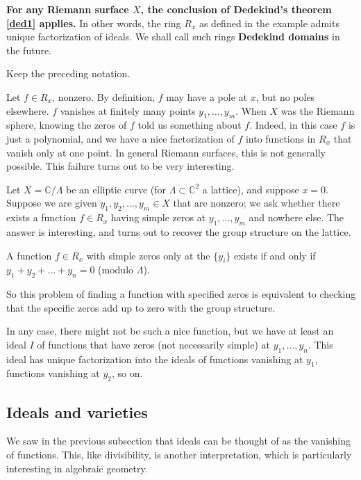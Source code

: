 \textbf{For any Riemann surface $X$, the conclusion of Dedekind's theorem
\ref{ded1} applies.} In other words, the ring $R_x$ as defined in the example
admits unique factorization of ideals. We shall call such rings
\textbf{Dedekind domains} in the future.

\begin{example}
Keep the preceding notation.

Let $f \in R_x$, nonzero. By definition, $f$ may have a pole at $x$, but no
poles elsewhere. $f$ vanishes at finitely many points $y_1, \dots, y_m$. When
$X$ was the Riemann sphere, knowing the zeros of $f$ told us something about
$f$. Indeed, in this case $f$ is just a polynomial, and we have a nice
factorization of $f$ into functions in $R_x$ that vanish only at one point. In
general Riemann surfaces, this is not generally possible. This failure turns
out to be very interesting.

Let $X = \mathbb{C}/\Lambda$ be an elliptic curve (for $\Lambda \subset
\mathbb{C}^2$ a lattice), and suppose $x = 0$. Suppose we are given $y_1, y_2,
\dots, y_m \in X$ that are nonzero; we ask whether there exists a function $f
\in R_x$ having simple zeros at $y_1, \dots, y_m$ and nowhere else. The answer
is interesting, and turns out to recover the group structure on the lattice.

\begin{proposition}
A function $f \in R_x$ with simple zeros only at the $\{ y_i \}$ exists if and
only if $y_1 + y_2 + \dots + y_n = 0$ (modulo $\Lambda$).
\end{proposition}

So this problem of finding a function with specified zeros is equivalent to
checking that the specific zeros add up to zero with the group structure.

In any case, there might not be such a nice function, but we have at least an
ideal $I$ of functions that have zeros (not necessarily simple) at $y_1, \dots,
y_n$. This ideal has unique factorization into the ideals of functions
vanishing at $y_1$, functions vanishing at $y_2$, so on.
\end{example}

\subsection{Ideals and varieties}

We saw in the previous subsection that ideals can be thought of as the
vanishing of functions. This, like divisibility, is another interpretation,
which is particularly interesting in algebraic geometry.

